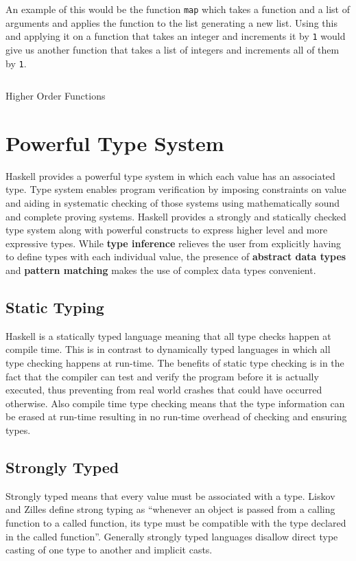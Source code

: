 An example of this would be the function \texttt{map} which takes a function and a list of arguments and applies the function to the list
generating a new list. Using this and applying it on a function that takes an integer and increments it by \texttt{1} would give us another
function that takes a list of integers and increments all of them by \texttt{1}.

\begin{listing}
\inputminted{haskell}{hs/higher_order.hs}
\caption{Higher Order Functions}
\end{listing}

\section{Powerful Type System}
Haskell provides a powerful type system in which each value has an associated type.
Type system enables program verification by imposing constraints on value and aiding in systematic checking of those systems using mathematically
sound and complete proving systems.
Haskell provides a strongly and statically checked type system along with powerful constructs to express higher level and more expressive types.
While \textbf{type inference} relieves the user from explicitly having to define types with each individual value,
the presence of \textbf{abstract data types} and \textbf{pattern matching} makes the use of complex data types convenient.

\subsection{Static Typing}
Haskell is a statically typed language meaning that all type checks happen at compile time. This is in contrast to dynamically typed languages
in which all type checking happens at run-time. The benefits of static type checking is in the fact that the compiler can test and verify the
program before it is actually executed, thus preventing from real world crashes that could have occurred otherwise.
Also compile time type checking means that the type information can be erased at run-time resulting in no run-time overhead of checking
and ensuring types.

\subsection{Strongly Typed}
Strongly typed means that every value must be associated with a type.
Liskov and Zilles define strong typing as ``whenever an object is passed from a calling function to a called function,
 its type must be compatible with the type declared in the called function''\cite{LZ74}.
Generally strongly typed languages disallow direct type casting of one type to another and implicit casts.


